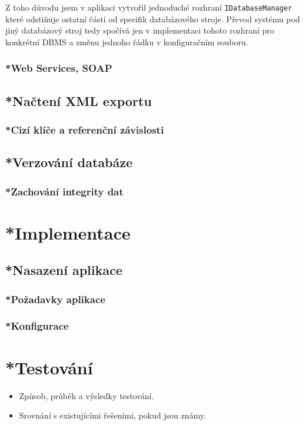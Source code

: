 \documentclass[11pt,twoside,a4paper]{book}
\begin{document}
Z toho důvodu jsem v aplikaci vytvořil jednoduché rozhraní {\tt IDatabaseManager} které odstiňuje ostatní části od specifik databázového stroje. Převod systému pod jiný databázový stroj tedy spočívá jen v implementaci tohoto rozhraní pro konkrétní DBMS a změnu jednoho řádku v konfiguračním souboru.

\subsection{*Web Services, SOAP}

\section{*Načtení XML exportu}
\subsection{*Cizí klíče a referenční závislosti}
\section{*Verzování databáze}
\subsection{*Zachování integrity dat}



\chapter{*Implementace}

 
\section{*Nasazení aplikace}
\subsection{*Požadavky aplikace}
\subsection{*Konfigurace}

\chapter{*Testování}
\begin{itemize}
 \item Způsob, průběh a výsledky testování.
 \item Srovnání s existujícími řešeními, pokud jsou známy.
\end{itemize}
\end{document}
